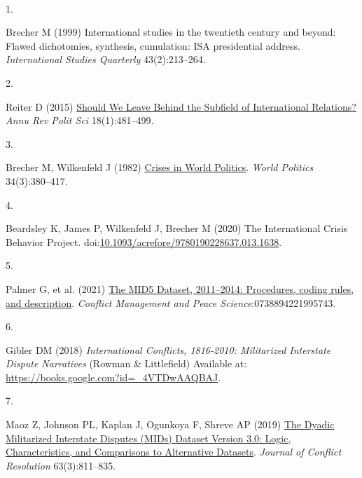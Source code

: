 \documentclass[9pt,twocolumn,twoside,lineno]{pnas-new}
\newlength{\cslhangindent}
\newlength{\csllabelwidth}
\newlength{\cslentryspacingunit} %
\newenvironment{CSLReferences}[2] %
 {%
  \setlength{\parindent}{0pt}
  \ifodd #1
  \let\oldpar\par
  \def\par{\hangindent=\cslhangindent\oldpar}
  \fi
  \setlength{\parskip}{#2\cslentryspacingunit}
 }%
 {}
\newcommand{\CSLLeftMargin}[1]{\parbox[t]{\csllabelwidth}{#1}}
\newcommand{\CSLRightInline}[1]{\parbox[t]{\linewidth - \csllabelwidth}{#1}\break}
\begin{document}
\showacknow{} %



~

\hypertarget{refs}{}
\begin{CSLReferences}{0}{0}
\leavevmode{}%
\CSLLeftMargin{1. }%
\CSLRightInline{Brecher M (1999) International studies in the twentieth
century and beyond: {Flawed} dichotomies, synthesis, cumulation: {ISA}
presidential address. \emph{International Studies Quarterly}
43(2):213--264.}

\leavevmode{}%
\CSLLeftMargin{2. }%
\CSLRightInline{Reiter D (2015)
\href{https://doi.org/10.1146/annurev-polisci-053013-041156}{Should {We
Leave Behind} the {Subfield} of {International Relations}?} \emph{Annu
Rev Polit Sci} 18(1):481--499.}

\leavevmode{}%
\CSLLeftMargin{3. }%
\CSLRightInline{Brecher M, Wilkenfeld J (1982)
\href{https://doi.org/10.2307/2010324}{Crises in {World Politics}}.
\emph{World Politics} 34(3):380--417.}

\leavevmode{}%
\CSLLeftMargin{4. }%
\CSLRightInline{Beardsley K, James P, Wilkenfeld J, Brecher M (2020) The
{International Crisis Behavior Project}.
doi:\href{https://doi.org/10.1093/acrefore/9780190228637.013.1638}{10.1093/acrefore/9780190228637.013.1638}.}

\leavevmode{}%
\CSLLeftMargin{5. }%
\CSLRightInline{Palmer G, et al. (2021)
\href{https://doi.org/10.1177/0738894221995743}{The {MID5 Dataset},
2011--2014: {Procedures}, coding rules, and description}. \emph{Conflict
Management and Peace Science}:0738894221995743.}

\leavevmode{}%
\CSLLeftMargin{6. }%
\CSLRightInline{Gibler DM (2018) \emph{International {Conflicts},
1816-2010: {Militarized Interstate Dispute Narratives}} ({Rowman \&
Littlefield}) Available at:
\url{https://books.google.com?id=_4VTDwAAQBAJ}.}

\leavevmode{}%
\CSLLeftMargin{7. }%
\CSLRightInline{Maoz Z, Johnson PL, Kaplan J, Ogunkoya F, Shreve AP
(2019) \href{https://doi.org/10.1177/0022002718784158}{The {Dyadic
Militarized Interstate Disputes} ({MIDs}) {Dataset Version} 3.0:
{Logic}, {Characteristics}, and {Comparisons} to {Alternative
Datasets}}. \emph{Journal of Conflict Resolution} 63(3):811--835.}


\end{CSLReferences}
\end{document}
